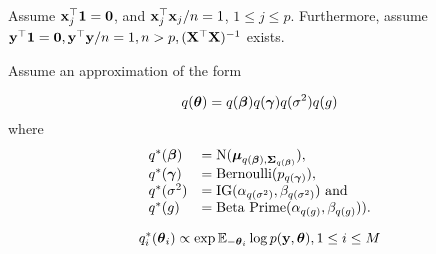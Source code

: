 \documentclass{article}[12pt]
\begin{document}
Assume ${\bf x}_j^\top{\bf1} = {\bf 0}$, and ${\bf x}_j^\top {\bf x}_j / n = 1$, $1 \leq j \leq p$.
Furthermore, assume ${\bf y}^\top {\bf1} = {\bf 0}, {\bf y}^\top {\bf y} / n  = 1, n > p, ({\bf X}^\top {\bf X})^{-1}$ exists.

Assume an approximation of the form

\begin{equation*}
q({\boldsymbol \theta}) = q({\boldsymbol \beta}) q({\boldsymbol \gamma}) q(\sigma^2) q(g)
\end{equation*}
where
\begin{equation*}
\begin{array}{ll}
q^*({\boldsymbol \beta}) &= \text{N}({\boldsymbol \mu}_{q({\boldsymbol \beta}), {\boldsymbol \Sigma}_{q({\boldsymbol \beta})}}), \\
q^*({\boldsymbol \gamma}) &= \text{Bernoulli}(p_{q({\boldsymbol \gamma})}), \\
q^*(\sigma^2) &= \text{IG}(\alpha_{q(\sigma^2)}, \beta_{q(\sigma^2)}) \text{ and } \\
q^*(g) &= \text{Beta Prime}(\alpha_{q(g)}, \beta_{q(g)})). \\
\end{array}
\end{equation*}

\begin{equation*}
q_i^*({\boldsymbol \theta}_i) \propto \exp{ {\mathbb E}_{-{\boldsymbol\theta}_i} \log{p({\bf y}, {\boldsymbol\theta})} }, 1 \leq i \leq M
\end{equation*}
\end{document}
